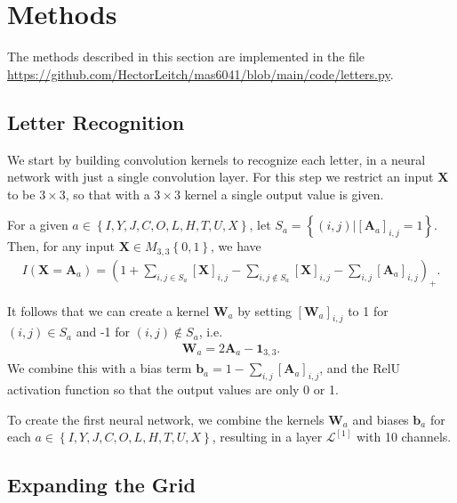 \documentclass{somasmsc}
\begin{document}
\section{Methods}

The methods described in this section are implemented in the file \url{https://github.com/HectorLeitch/mas6041/blob/main/code/letters.py}.

\subsection{Letter Recognition}\label{letters:letter}

We start by building convolution kernels to recognize each letter, in a neural network with just a single convolution layer. For this step we restrict an input $\mathbf{X}$ to be $3 \times 3$, so that with a $3 \times 3$ kernel a single output value is given.

For a given $a \in \left\{I, Y, J, C, O, L, H, T, U, X\right\}$, let $S_a = \left\{\left(i, j\right) | \left[\mathbf{A}_a\right]_{i,j} = 1\right\}$. Then, for any input $\mathbf{X} \in M_{3,3}\left\{0,1\right\}$, we have
\begin{align}\label{letters:eq0}
I(\mathbf{X} = \mathbf{A}_a) = \left(1 + \sum_{i, j \in S_a} \left[\mathbf{X}\right]_{i,j} - \sum_{i, j \notin S_a} \left[\mathbf{X}\right]_{i,j} - \sum_{i,j} \left[\mathbf{A}_a\right]_{i,j}\right)_+.
\end{align}

It follows that we can create a kernel $\mathbf{W}_a$ by setting $\left[\mathbf{W}_a\right]_{i,j}$ to 1 for $\left(i,j\right) \in S_a$ and -1 for $\left(i,j\right) \notin S_a$, i.e.
\begin{align*}
\mathbf{W}_a = 2\mathbf{A}_a - \mathbf{1}_{3,3}.
\end{align*}
We combine this with a bias term $\mathbf{b}_a = 1 - \sum_{i,j} \left[\mathbf{A}_a\right]_{i,j}$, and the RelU activation function so that the output values are only 0 or 1.

To create the first neural network, we combine the kernels $\mathbf{W}_a$ and biases $\pmb{b}_a$ for each $a \in \left\{I, Y, J, C, O, L, H, T, U, X\right\}$, resulting in a layer $\mathcal{L}^{\left[1\right]}$ with 10 channels.

\subsection{Expanding the Grid}\label{letters:expand}
\end{document}

